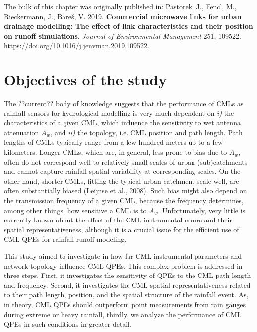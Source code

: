 \documentclass{ctuthesis}\usepackage[]{graphicx}\usepackage[]{color}
\begin{document}
{\footnotesize The bulk of this chapter was originally published in: \newline
\-\hspace{0.5cm}
Pastorek, J., Fencl, M., Rieckermann, J., Bareš, V. 2019. \textbf{Commercial microwave links for urban drainage modelling: The effect of link characteristics and their position on runoff simulations}. \emph{Journal of Environmental Management} 251, 109522. \newline https://doi.org/10.1016/j.jenvman.2019.109522.
}

\section{Objectives of the study}

The ??current?? body of knowledge suggests that the performance of CMLs as rainfall sensors for hydrological modelling is very much dependent on \emph{i)} the characteristics of a given CML, which influence the sensitivity to wet antenna attenuation $A_w$, and \emph{ii)} the topology, i.e. CML position and path length. Path lengths of CMLs typically range from a few hundred meters up to a few kilometers. Longer CMLs, which are, in general, less prone to bias due to $A_w$, often do not correspond well to relatively small scales of urban (sub)catchments and cannot capture rainfall spatial variability at corresponding scales. On the other hand, shorter CMLs, fitting the typical urban catchment scale well, are often substantially biased (Leijnse et al., 2008). Such bias might also depend on the transmission frequency of a given CML, because the frequency determines, among other things, how sensitive a CML is to $A_w$. Unfortunately, very little is currently known about the effect of the CML instrumental errors and their spatial representativeness, although it is a crucial issue for the efficient use of CML QPEs for rainfall-runoff modeling.

This study aimed to investigate in how far CML instrumental parameters and network topology influence CML QPEs. This complex problem is addressed in three steps. First, it investigates the sensitivity of QPEs to the CML path length and frequency. Second, it investigates the CML spatial representativeness related to their path length, position, and the spatial structure of the rainfall event. As, in theory, CML QPEs should outperform point measurements from rain gauges during extreme or heavy rainfall, thirdly, we analyze the performance of CML QPEs in such conditions in greater detail. 
\end{document}
